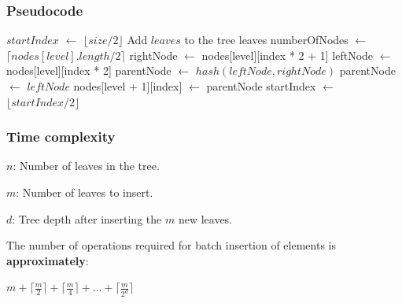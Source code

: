\documentclass{article}
\begin{document}
\subsubsection{Pseudocode}

\begin{algorithm}[H]
    \caption{LeanIMT InsertMany algorithm}\label{insertMany}
    \begin{algorithmic}[1]
        \State $startIndex$ $\gets$ $\lfloor size/2 \rfloor$ 
        \State Add $leaves$ to the tree leaves
        \State numberOfNodes $\gets$ $\lceil nodes[level].length / 2 \rceil$ 
        \State rightNode $\gets$ nodes[level][index * 2 + 1] 
        \State leftNode $\gets$ nodes[level][index * 2] 
        \State parentNode $\gets$ $hash(leftNode, rightNode)$
        \Else
        \State parentNode $\gets$ $leftNode$
        \EndIf
        \State nodes[level + 1][index] $\gets$ parentNode 
        \EndFor
        \State startIndex $\gets$ $\lfloor startIndex/2 \rfloor$ 
        \EndFor
        \EndProcedure
    \end{algorithmic}
\end{algorithm}


\subsubsection{Time complexity}

$n$: Number of leaves in the tree.

$m$: Number of leaves to insert.

$d$: Tree depth after inserting the $m$ new leaves.

The number of operations required for batch insertion of elements is \textbf{approximately}:

$ m + \lceil \frac{m}{2} \rceil + \lceil \frac{m}{4} \rceil + ... + \lceil \frac{m}{2^d} \rceil$
\end{document}
